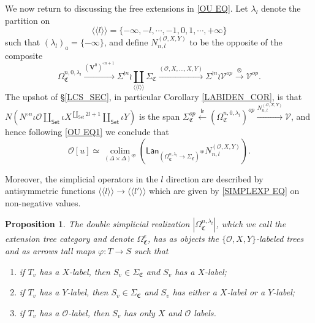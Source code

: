 \documentclass[a4paper,10pt
,draft
]{article}%
\numberwithin{equation}{section}
\numberwithin{figure}{section}
\newtheorem{proposition}[equation]{Proposition}%
\theoremstyle{definition} %
\DeclareMathOperator{\colim}{colim}%
\newcommand{\V}{\ensuremath{\mathcal V}}
\renewcommand{\O}{\ensuremath{\mathcal O}}
\newcommand{\1}{\ensuremath{\mathbbm 1}}%
\newcommand{\OC}{\Omega_{\mathfrak C}}
\begin{document}
We now return to discussing the free extensions in \eqref{OU EQ}.
%
Let $\lambda_l$ denote the partition on 
\[
\langle \langle l \rangle \rangle
=
\{-\infty,-l,\cdots,-1,0,1,\cdots,+\infty\}
\]
such that $\left(\lambda_l\right)_a = \{-\infty\}$,
and define $N_{n,l}^{(\O,X,Y)}$ to be the opposite of the composite
\[
      \Omega_{\mathfrak C}^{n,0,\lambda_l} \xrightarrow{(\boldsymbol{V}^0)^{\circ n+1}}
      \Sigma^{\wr n} \wr \coprod_{\langle \langle l \rangle \rangle} \Sigma_{\mathfrak C} \xrightarrow{(\O,X,\dots,X,Y)}
      \Sigma^{\wr n} \wr \V^{op} \xrightarrow{\otimes}
      \V^{op}.
\]
The upshot of \S \ref{LCS_SEC}, in particular Corollary \ref{LABIDEN_COR}, is that
$\mbox{$N \left(N^{\circ n} \iota \O \amalg_{\mathsf{Set}} \iota X^{\amalg_{\mathsf{Set}} 2l +1}\amalg_{\mathsf{Set}} \iota Y \right)$}$
is the span
$\mbox{$\Sigma_{\mathfrak C}^{op} \xleftarrow{\mathsf{lr}} (\Omega_{\mathfrak C}^{n,0,\lambda_l})^{op} \xrightarrow{N_{n,l}^{(\O,X,Y)}} \V$}$,
and hence following \eqref{OU EQ1} we conclude that
\begin{equation}\label{1STRED EQ}
\O[u] \simeq
\mathop{\colim}\limits_{(\Delta \times \Delta)^{op}}
\left(
	\mathsf{Lan}_{\left(\Omega_{\mathfrak C}^{n,\lambda_l} \to \Sigma_{\mathfrak C}\right)^{op}} N_{n,l}^{(\O,X,Y)}
\right).
\end{equation}


Moreover, the simplicial operators in the $l$ direction are described by antisymmetric functions $\langle \langle l \rangle \rangle
 \to \langle \langle l' \rangle \rangle
$
which are given by \eqref{SIMPLEXP EQ} on non-negative values.


\begin{proposition}\label{EXTENTREE PROP}
The double simplicial realization
$|\Omega_{\mathfrak C}^{n,\lambda_l}|$,
which we call the \textit{extension tree category}
and denote
$\OC^e$, has as objects the 
$\{\O,X,Y\}$-labeled trees
and as arrows tall maps $\varphi \colon T \to S$ such that
\begin{enumerate}[label=(\roman*)]
\item if $T_v$ has a $X$-label, then 
$S_v \in \Sigma_{\mathfrak{C}}$ and
$S_v $ has a $X$-label;
\item if $T_v$ has a $Y$-label, then 
$S_v \in \Sigma_{\mathfrak{C}}$ and
$S_v $ has either a $X$-label or a $Y$-label;
\item if $T_v$ has a $\O$-label, then 
$S_v $ has only $X$ and $\O$ labels.
\end{enumerate}
\end{proposition}
\end{document}
